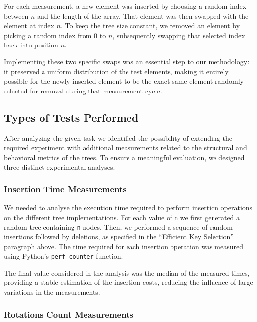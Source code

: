\documentclass[12pt,a4paper]{article}
\begin{document}
                For each measurement, a new element was inserted by choosing a random index between $n$ and the length of the array. That element was then swapped with the element at index $n$. To keep the tree size constant, we removed an element by picking a random index from $0$ to $n$, subsequently swapping that selected index back into position $n$.

                Implementing these two specific swaps was an essential step to our methodology: it preserved a uniform distribution of the test elements, making it entirely possible for the newly inserted element to be the exact same element randomly selected for removal during that measurement cycle.

        \subsection{Types of Tests Performed}

            After analyzing the given task we identified the possibility of extending the required experiment with additional measurements related to the structural and behavioral metrics of the trees. To ensure a meaningful evaluation, we designed three distinct experimental analyses.

            \subsubsection{Insertion Time Measurements}

                We needed to analyse the execution time required to perform insertion operations on the different tree implementations. For each value of \texttt{n} we first generated a random tree containing \texttt{n} nodes. Then, we performed a sequence of random insertions followed by deletions, as specified in the ``Efficient Key Selection'' paragraph above. The time required for each insertion operation was measured using Python's \texttt{perf\_counter} function.

                The final value considered in the analysis was the median of the measured times, providing a stable estimation of the insertion costs, reducing the influence of large variations in the measurements.

            \subsubsection{Rotations Count Measurements}
\end{document}
